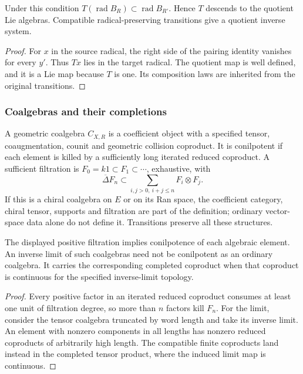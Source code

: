 \begin{proposition}
\label{prop:transition-radical-preservation-criterion}
Under this condition $T(\operatorname{rad}B_R)
\subset\operatorname{rad}B_{R'}$. Hence $T$ descends to the
quotient Lie algebras. Compatible radical-preserving
transitions give a quotient inverse system.
\end{proposition}

\begin{proof}
For $x$ in the source radical, the right side of the pairing
identity vanishes for every $y'$. Thus $Tx$ lies in the target
radical. The quotient map is well defined, and it is a Lie
map because $T$ is one. Its composition laws are inherited
from the original transitions.
\end{proof}

\subsubsection*{Coalgebras and their completions}

\begin{definition}
\label{def:conilpotent-source-coalgebra}
A geometric coalgebra $C_{X,R}$ is a coefficient object with a
specified tensor, coaugmentation, counit and geometric collision
coproduct. It is conilpotent if each element is killed by a
sufficiently long iterated reduced coproduct. A sufficient
filtration is
$F_0=k1\subset F_1\subset\cdots$, exhaustive, with
\[
 \overline\Delta F_n\subset
 \sum_{i,j>0,\ i+j\leq n}F_i\otimes F_j.
\]
If this is a chiral coalgebra on $E$ or on its Ran space, the
coefficient category, chiral tensor, supports and filtration
are part of the definition; ordinary vector-space data alone
do not define it. Transitions preserve all these structures.
\end{definition}

\begin{proposition}
\label{prop:conilpotent-source-coalgebra-firewall}
The displayed positive filtration implies conilpotence of
each algebraic element. An inverse limit of such coalgebras
need not be conilpotent as an ordinary coalgebra. It carries
the corresponding completed coproduct when that coproduct
is continuous for the specified inverse-limit topology.
\end{proposition}

\begin{proof}
Every positive factor in an iterated reduced coproduct consumes
at least one unit of filtration degree, so more than $n$
factors kill $F_n$. For the limit, consider the tensor
coalgebra truncated by word length and take its inverse limit.
An element with nonzero components in all lengths has
nonzero reduced coproducts of arbitrarily high length.
The compatible finite coproducts land instead in the completed
tensor product, where the induced limit map is continuous.
\end{proof}

